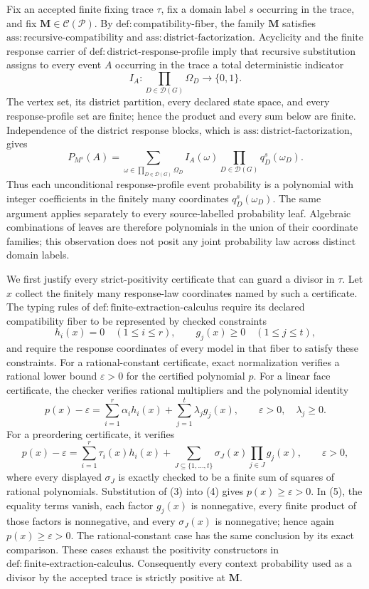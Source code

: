 Fix an accepted finite fixing trace \(\tau\), fix a domain label \(s\) occurring in the trace, and fix \(\mathbf M\in\mathcal C(\mathcal P)\). By \(\mathrm{def:compatibility\text{-}fiber}\), the family \(\mathbf M\) satisfies \(\mathrm{ass:recursive\text{-}compatibility}\) and \(\mathrm{ass:district\text{-}factorization}\). Acyclicity and the finite response carrier of \(\mathrm{def:district\text{-}response\text{-}profile}\) imply that recursive substitution assigns to every event \(A\) occurring in the trace a total deterministic indicator
\[
 I_A:\prod_{D\in\mathcal D(G)}\Omega_D\longrightarrow\{0,1\}.
\tag{1}
\]
The vertex set, its district partition, every declared state space, and every response-profile set are finite; hence the product and every sum below are finite. Independence of the district response blocks, which is \(\mathrm{ass:district\text{-}factorization}\), gives
\[
 P_{M^s}(A)
 =\sum_{\omega\in\prod_{D\in\mathcal D(G)}\Omega_D}
 I_A(\omega)\prod_{D\in\mathcal D(G)}q_D^s(\omega_D).
\tag{2}
\]
Thus each unconditional response-profile event probability is a polynomial with integer coefficients in the finitely many coordinates \(q_D^s(\omega_D)\). The same argument applies separately to every source-labelled probability leaf. Algebraic combinations of leaves are therefore polynomials in the union of their coordinate families; this observation does not posit any joint probability law across distinct domain labels.

We first justify every strict-positivity certificate that can guard a divisor in \(\tau\). Let \(x\) collect the finitely many response-law coordinates named by such a certificate. The typing rules of \(\mathrm{def:finite\text{-}extraction\text{-}calculus}\) require its declared compatibility fiber to be represented by checked constraints
\[
 h_i(x)=0\quad(1\le i\le r),
 \qquad
 g_j(x)\ge 0\quad(1\le j\le t),
\tag{3}
\]
and require the response coordinates of every model in that fiber to satisfy these constraints. For a rational-constant certificate, exact normalization verifies a rational lower bound \(\varepsilon>0\) for the certified polynomial \(p\). For a linear face certificate, the checker verifies rational multipliers and the polynomial identity
\[
 p(x)-\varepsilon
 =\sum_{i=1}^{r}\alpha_i h_i(x)
  +\sum_{j=1}^{t}\lambda_j g_j(x),
 \qquad \varepsilon>0,\quad \lambda_j\ge 0.
\tag{4}
\]
For a preordering certificate, it verifies
\[
 p(x)-\varepsilon
 =\sum_{i=1}^{r}\tau_i(x)h_i(x)
  +\sum_{J\subseteq\{1,\ldots,t\}}
    \sigma_J(x)\prod_{j\in J}g_j(x),
 \qquad \varepsilon>0,
\tag{5}
\]
where every displayed \(\sigma_J\) is exactly checked to be a finite sum of squares of rational polynomials. Substitution of (3) into (4) gives \(p(x)\ge\varepsilon>0\). In (5), the equality terms vanish, each factor \(g_j(x)\) is nonnegative, every finite product of those factors is nonnegative, and every \(\sigma_J(x)\) is nonnegative; hence again \(p(x)\ge\varepsilon>0\). The rational-constant case has the same conclusion by its exact comparison. These cases exhaust the positivity constructors in \(\mathrm{def:finite\text{-}extraction\text{-}calculus}\). Consequently every context probability used as a divisor by the accepted trace is strictly positive at \(\mathbf M\).

